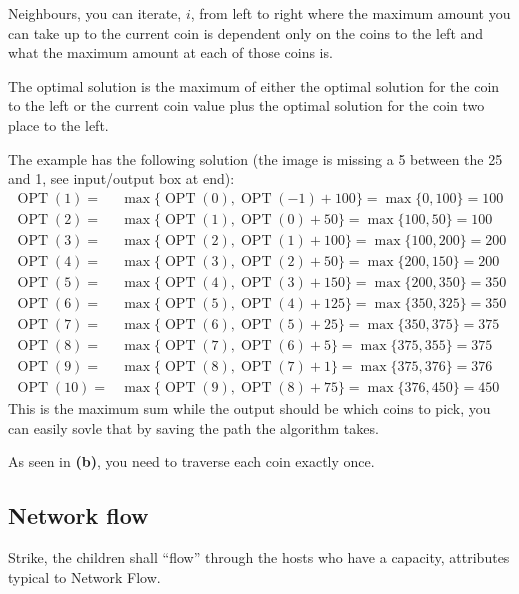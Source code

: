\documentclass[a4paper]{article}
\newenvironment{task}[1]
{
	\begin{description}[align=right]
		\item [#1]
}{		%
	\end{description}
}
\newcommand{\taskref}[1]{\textbf{#1}}
\DeclareMathOperator{\OPT}{OPT}
\DeclareMathOperator{\*}{\cdot}
\begin{document}
\begin{task}{5. (a)}
	 Neighbours, you can iterate, $i$, from left to right where the maximum amount you can take up to the current coin is dependent only on the coins to the left and what the maximum amount at each of those coins is.
\end{task}

\begin{task}{(b)}
	 The optimal solution is the maximum of either the optimal solution for the coin to the left or the current coin value plus the optimal solution for the coin two place to the left.
	
	The example has the following solution (the image is missing a 5 between the 25 and 1, see input/output box at end):
	\begin{align*}
		\OPT(1)=&\max\{\OPT(0), \OPT(-1)+100\}=\max\{0,100\}=100 \\
		\OPT(2)=&\max\{\OPT(1), \OPT(0)+50\}=\max\{100,50\}=100 \\
		\OPT(3)=&\max\{\OPT(2), \OPT(1)+100\}=\max\{100,200\}=200 \\
		\OPT(4)=&\max\{\OPT(3), \OPT(2)+50\}=\max\{200,150\}=200 \\
		\OPT(5)=&\max\{\OPT(4), \OPT(3)+150\}=\max\{200,350\}=350 \\
		\OPT(6)=&\max\{\OPT(5), \OPT(4)+125\}=\max\{350,325\}=350 \\
		\OPT(7)=&\max\{\OPT(6), \OPT(5)+25\}=\max\{350,375\}=375 \\
		\OPT(8)=&\max\{\OPT(7), \OPT(6)+5\}=\max\{375,355\}=375 \\
		\OPT(9)=&\max\{\OPT(8), \OPT(7)+1\}=\max\{375,376\}=376 \\
		\OPT(10)=&\max\{\OPT(9), \OPT(8)+75\}=\max\{376,450\}=450
	\end{align*} 
	This is the maximum sum while the output should be which coins to pick, you can easily sovle that by saving the path the algorithm takes. 
\end{task}

\begin{task}{(c)}
	 As seen in \taskref{(b)}, you need to traverse each coin exactly once.
\end{task}

\subsection*{Network flow}

\begin{task}{6. (a)}
	 Strike, the children shall ``flow'' through the hosts who have a capacity, attributes typical to Network Flow.
\end{task}
\end{document}
